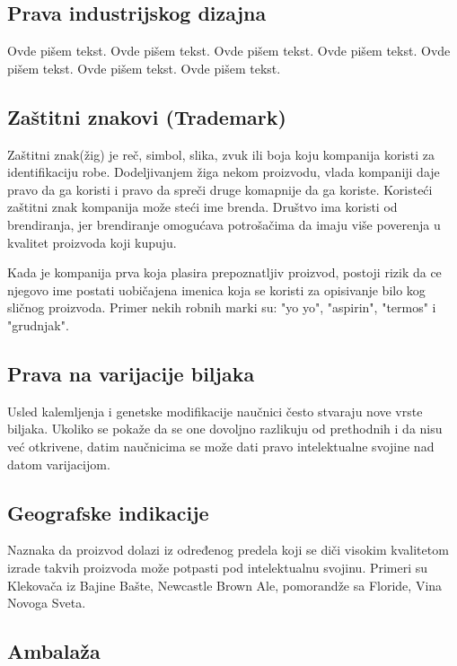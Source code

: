 \documentclass[a4paper]{article}
\begin{document}
\subsection{Prava industrijskog dizajna}
\label{subsec:dizajn}

Ovde pišem tekst. 
Ovde pišem tekst. 
Ovde pišem tekst. 
Ovde pišem tekst. 
Ovde pišem tekst. 
Ovde pišem tekst. 
Ovde pišem tekst. 

\subsection{Zaštitni znakovi (Trademark)}
\label{subsec:trademark}

Zaštitni znak(žig) je reč, simbol, slika, zvuk ili boja koju kompanija koristi za identifikaciju robe. Dodeljivanjem žiga nekom proizvodu, vlada kompaniji daje pravo da ga koristi i pravo da spreči druge komapnije da ga koriste. Koristeći zaštitni znak kompanija može steći ime brenda. Društvo ima koristi od brendiranja, jer brendiranje omogućava potrošačima da imaju više poverenja u kvalitet proizvoda koji kupuju. 

Kada je kompanija prva koja plasira prepoznatljiv proizvod, postoji rizik da ce njegovo ime postati uobičajena imenica koja se koristi za opisivanje bilo kog sličnog proizvoda. Primer nekih robnih marki su: "yo yo", "aspirin", "termos" i "grudnjak".

\subsection{Prava na varijacije biljaka}
\label{subsec:granje}

Usled kalemljenja i genetske modifikacije naučnici često stvaraju nove vrste biljaka. Ukoliko se pokaže da se one dovoljno razlikuju od prethodnih i da nisu već otkrivene, datim naučnicima se može dati pravo intelektualne svojine nad datom varijacijom.

\subsection{Geografske indikacije}
\label{subsec:geo}

Naznaka da proizvod dolazi iz određenog predela koji se diči visokim kvalitetom izrade takvih proizvoda može potpasti pod intelektualnu svojinu. Primeri su Klekovača iz Bajine Bašte, Newcastle Brown Ale, pomorandže sa Floride, Vina Novoga Sveta.

\subsection{Ambalaža}
\label{subsec:ambalaza}
\end{document}
